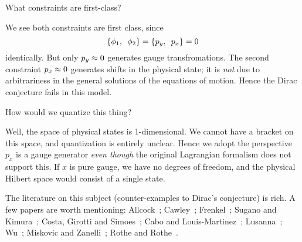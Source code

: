  What constraints are first-class?

\begin{soln}
We see both constraints are first class, since
\begin{equation}
\left\{\phi_{1},\enspace\phi_{2}\right\}=\left\{p_{y},\enspace p_{x}\right\}=0
\end{equation}
identically. But only $p_{y}\approx0$ generates gauge
transfromations. The second constraint $p_{x}\approx0$ generates shifts
in the physical state; it is \emph{not} due to arbitrariness in the
general solutions of the equations of motion. Hence the Dirac conjecture
fails in this model.
\end{soln}

 How would we quantize this thing?

\begin{soln}
Well, the space of physical states is 1-dimensional. We cannot have a
bracket on this space, and quantization is entirely unclear. Hence we
adopt the perspective $p_{x}$ is a gauge generator \emph{even though}
the original Lagrangian formalism does not support this. If $x$ is pure
gauge, we have no degrees of freedom, and the physical Hilbert space
would consist of a single state.
\end{soln}

The literature on this subject (counter-examples to Dirac's conjecture)
is rich. A few papers are worth mentioning: Allcock~\cite{allcock1975};
Cawley~\cite{PhysRevLett.42.413}; Frenkel~\cite{Frenkel:1980nt};
Sugano and Kimura~\cite{Sugano:1982sy}; Costa, Girotti and 
Simoes~\cite{Costa:1985tt}; Cabo and Louis-Martinez~\cite{Cabo:1990jk};
Lusanna~\cite{Lusanna:1991je,Lusanna:1991im};
Wu~\cite{Wu:1994jd}; Miskovic and Zanelli~\cite{Miskovic:2003ex};
Rothe and Rothe~\cite{Rothe:2004jc}.

